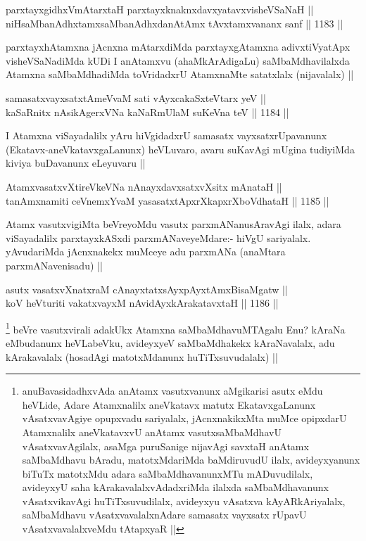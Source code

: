 \begin{shl}
parxtayxgidhxVmAtarxtaH parxtayxknaknxdavxyatavxvisheVSaNaH || \\
niHsaMbanAdhxtamxsaMbanAdhxdanAtAmx tAvxtamxvananx sanf ||  1183 ||  
\end{shl}

\begin{artha}
parxtayxhAtamxna jAcnxna mAtarxdiMda parxtayxgAtamxna adivxtiVyatApx visheVSaNadiMda kUDi I anAtamxvu (ahaMkArAdigaLu) saMbaMdhavilalxda Atamxna saMbaMdhadiMda toVridadxrU AtamxnaMte satatxlalx (nijavalalx) ||
\end{artha}


\begin{shl}
samasatxvayxsatxtAmeVvaM sati vAyxcakaSxteV\s tarx yeV || \\
kaSaRnitx nAsikAgerxVNa kaNaRmUlaM suKeVna teV ||  1184 ||  
\end{shl}

\begin{artha}
I Atamxna viSayadalilx yAru hiVgidadxrU samasatx vayxsatxrUpavanunx (Ekatavx-aneVkatavxgaLanunx) heVLuvaro, avaru suKavAgi mUgina tudiyiMda kiviya buDavanunx eLeyuvaru ||
\end{artha}

\begin{shl}
AtamxvasatxvXtireVkeVNa nAnayxdavxsatxvXsitx mAnataH || \\
tanAmxnamiti ceVnemxYvaM yasasatxtApxrXkapxrXboVdhataH ||  1185 ||  
\end{shl}

\begin{artha}
Atamx vasutxvigiMta beVreyoMdu vasutx parxmANanusAravAgi ilalx, adara viSayadalilx parxtayxkASxdi parxmANaveyeMdare:- hiVgU sariyalalx. yAvudariMda jAcnxnakekx muMceye adu parxmANa (anaMtara parxmANavenisadu) ||
\end{artha}

\begin{shl}
asutx vasatxvXnatxraM cAnayxtatxsAyxpAyxtAmxBisaMgatw || \\
koV heVturiti vakatxvayxM nAvidAyx\s kArakatavxtaH ||  1186 ||  
\end{shl}

\begin{artha}
\footnote{anuBavasidadhxvAda anAtamx vasutxvanunx aMgikarisi asutx eMdu heVLide, Adare Atamxnalilx aneVkatavx matutx EkatavxgaLanunx vAsatxvavAgiye opupxvadu sariyalalx, jAcnxnakikxMta muMce opipxdarU Atamxnalilx aneVkatavxvU anAtamx vasutxsaMbaMdhavU vAsatxvavAgilalx, asaMga puruSanige nijavAgi savxtaH anAtamx saMbaMdhavu bAradu, matotxMdariMda baMdiruvudU ilalx, avideyxyanunx biTuTx matotxMdu adara saMbaMdhavanunxMTu mADuvudilalx, avideyxyU saha kArakavalalxvAdadxriMda ilalxda saMbaMdhavanunx vAsatxvikavAgi huTiTxsuvudilalx, avideyxyu vAsatxva kAyARkAriyalalx, saMbaMdhavu vAsatxvavalalxnAdare samasatx vayxsatx rUpavU vAsatxvavalalxveMdu tAtapxyaR ||}
beVre vasutxvirali adakUkx Atamxna saMbaMdhavuMTAgalu Enu? kAraNa eMbudanunx heVLabeVku, avideyxyeV saMbaMdhakekx kAraNavalalx, adu kArakavalalx (hosadAgi matotxMdanunx huTiTxsuvudalalx) ||
\end{artha}

